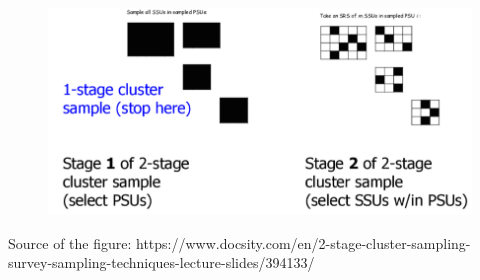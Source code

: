 \documentclass[12pt]{article}
\begin{document}
\begin{itemize}
{\begin{minipage}[t]{0.97\linewidth}
\begin{figure}[H]
\begin{center}
\includegraphics[scale=0.9]{Ex0_2.png}
\end{center}
\end{figure}
Source of the figure: https://www.docsity.com/en/2-stage-cluster-sampling-survey-sampling-techniques-lecture-slides/394133/
\end{minipage}}
\end{itemize}
\end{document}
